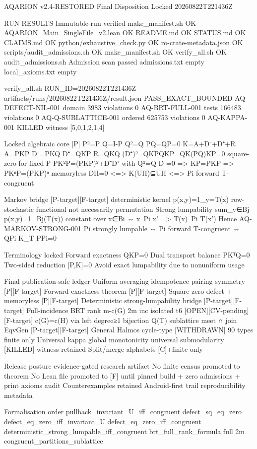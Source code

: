AQARION v2.4-RESTORED Final Disposition Locked 20260822T221436Z

RUN RESULTS Immutable-run verified
make_manifest.sh OK
AQARION_Main_SingleFile_v2.lean OK
README.md OK STATUS.md OK CLAIMS.md OK
python/exhaustive_check.py OK
ro-crate-metadata.json OK
scripts/audit_admissions.sh OK make_manifest.sh OK verify_all.sh OK
audit_admissions.sh Admission scan passed admissions.txt empty local_axioms.txt empty

verify_all.sh RUN_ID=20260822T221436Z
artifacts/runs/20260822T221436Z/result.json PASS_EXACT_BOUNDED
AQ-DEFECT-NIL-001 domain 3983 violations 0
AQ-BRT-FULL-001 tests 166483 violations 0
AQ-Q-SUBLATTICE-001 ordered 625753 violations 0
AQ-KAPPA-001 KILLED witness [5,0,1,2,1,4]

Locked algebraic core [P]
P²=P Q=I-P Q²=Q PQ=QP=0
K=A+D⁻+D⁺+R A=PKP D⁻=PKQ D⁺=QKP R=QKQ
(D⁺)²=QKPQKP=QK(PQ)KP=0 square-zero for fixed P
PK²P=(PKP)²+D⁻D⁺ with Q²=Q
D⁺=0 => KP=PKP => PKⁿP=(PKP)ⁿ memoryless
DΠ=0 <=> K(UΠ)⊆UΠ <=> Pi forward T-congruent

Markov bridge [P-target][F-target] deterministic kernel p(x,y)=1_{y=T(x)} row-stochastic functional not necessarily permutation
Strong lumpability sum_{y∈Bj} p(x,y)=1_{Bj}(T(x)) constant over x∈Bi ⇔ x~Pi x' => T(x)~Pi T(x')
Hence AQ-MARKOV-STRONG-001 Pi strongly lumpable ⇔ Pi forward T-congruent ⇔ QPi K_T PPi=0

Terminology locked Forward exactness QKP=0 Dual transport balance PKᵀQ=0 Two-sided reduction [P,K]=0 Avoid exact lumpability due to nonuniform usage

Final publication-safe ledger
Uniform averaging idempotence pairing symmetry [P][F-target]
Forward exactness theorem [P][F-target]
Square-zero defect + memoryless [P][F-target]
Deterministic strong-lumpability bridge [P-target][F-target]
Full-incidence BRT rank m-c(G) 2m inc isolated t6 [OPEN][CV-pending][F-target] c(G)=c(H) via left degree≥1 bijection
Q(T) sublattice meet ∩ join EqvGen [P-target][F-target]
General Halmos cycle-type [WITHDRAWN] 90 types finite only
Universal kappa global monotonicity universal submodularity [KILLED] witness retained
Split/merge alphabets [C]+finite only

Release posture evidence-gated research artifact No finite census promoted to theorem No Lean file promoted to [F] until pinned build + zero admissions + print axioms audit Counterexamples retained Android-first trail reproducibility metadata

Formalisation order pullback_invariant_U_iff_congruent defect_sq_eq_zero defect_eq_zero_iff_invariant_U defect_eq_zero_iff_congruent deterministic_strong_lumpable_iff_congruent brt_full_rank_formula full 2m congruent_partitions_sublattice

